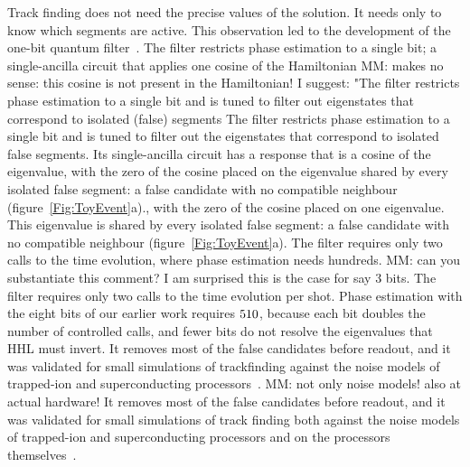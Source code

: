 \documentclass[11pt,a4paper]{article}
\newcommand{\mm}[1]{{\color{purple} MM: #1 }}
\newcommand{\gss}[1]{{\color{teal} #1}}
\begin{document}
Track finding does not need the precise values of the solution. It needs only to know which
segments are active. This observation led to the development of the one-bit quantum
filter~\cite{trackhhl_epj,trackhhl}. 
The filter restricts phase estimation to a single bit; a
single-ancilla circuit that applies one cosine of the Hamiltonian \mm{makes no sense: this cosine is not present in the Hamiltonian! I suggest: "The filter restricts phase estimation to a single bit and is tuned to filter out eigenstates that correspond to isolated (false) segments} \gss{The filter restricts phase estimation to a single bit and is tuned to filter out the eigenstates that correspond to isolated false segments. Its single-ancilla circuit has a response that is a cosine of the eigenvalue, with the zero of the cosine placed on the eigenvalue shared by every isolated false segment: a false candidate with no compatible neighbour (figure~\ref{Fig:ToyEvent}a).}, with the zero of the cosine
placed on one eigenvalue. This eigenvalue is shared by every isolated false segment: a false
candidate with no compatible neighbour (figure~\ref{Fig:ToyEvent}a). The filter requires only two calls to
the time evolution, where phase estimation needs hundreds. \mm{can you substantiate this comment? I am surprised this is the case for say 3 bits.} \gss{The filter requires only two calls to the time evolution per shot. Phase estimation with the eight bits of our earlier work requires $510$, because each bit doubles the number of controlled calls, and fewer bits do not resolve the eigenvalues that HHL must invert.} It removes most of the false candidates
before readout, and it was validated for small simulations of trackfinding against the noise models of trapped-ion and superconducting
processors~\cite{trackhhl}. \mm{not only noise models! also at actual hardware!} \gss{It removes most of the false candidates before readout, and it was validated for small simulations of track finding both against the noise models of trapped-ion and superconducting processors and on the processors themselves~\cite{trackhhl}.}
\end{document}
